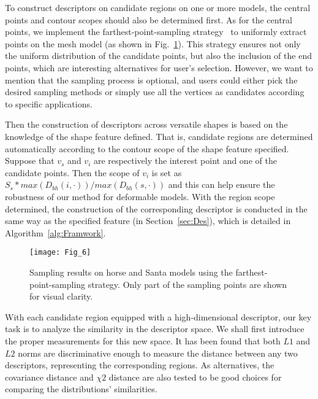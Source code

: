 To construct descriptors on candidate regions on one or more models,
the central points and contour scopes should also be determined first.
As for the central points, we implement the farthest-point-sampling
strategy~\cite{Moenning:2003} to uniformly extract points on the mesh
model (as shown in Fig.~\ref{Sampling}). This strategy ensures not
only the uniform distribution of the candidate points, but also the
inclusion of the end points, which are interesting alternatives for
user's selection. However, we want to mention that the sampling
process is optional, and users could either pick the desired sampling
methods or simply use all the vertices as candidates according to
specific applications.

Then the construction of descriptors across versatile shapes is based
on the knowledge of the shape feature defined. That is, candidate
regions are determined automatically according to the contour scope of
the shape feature specified. Suppose that $v_{s}$ and $v_{i}$ are
respectively the interest point and one of the candidate points. Then
the scope of $v_{i}$ is set as
$S_{s}*max(D_{bh}(i,\cdot))/max(D_{bh}(s,\cdot))$ and this can help
ensure the robustness of our method for deformable models.  With the
region scope determined, the construction of the corresponding
descriptor is conducted in the same way as the specified feature (in
Section~\ref{sec:Des}), which is detailed in
Algorithm~\ref{alg:Framwork}.

\begin{figure}[!to]
\begin{center}
\texttt{[image: Fig\_6]}
\end{center}
\caption[Point sampling on the horse and Santa models.]
  {Sampling results on horse and Santa models using the
  farthest-point-sampling strategy. Only part of the sampling points
  are shown for visual clarity.}
\label{Sampling}
\end{figure}

With each candidate region equipped with a high-dimensional
descriptor, our key task is to analyze the similarity in the
descriptor space. We shall first introduce the proper measurements
for this new space. It has been found that both $L1$ and $L2$ norms
are discriminative enough to measure the distance between any two
descriptors, representing the corresponding regions. As alternatives,
the covariance distance and $\chi{2}$ distance are also tested to be
good choices for comparing the distributions' similarities.

